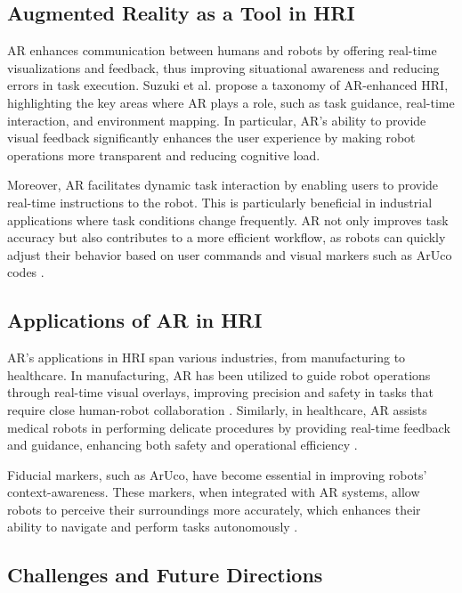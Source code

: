 \subsection{Augmented Reality as a Tool in HRI}

AR enhances communication between humans and robots by offering real-time visualizations and feedback, thus improving situational awareness and reducing errors in task execution. Suzuki et al. \cite{Suzuki2022} propose a taxonomy of AR-enhanced HRI, highlighting the key areas where AR plays a role, such as task guidance, real-time interaction, and environment mapping. In particular, AR’s ability to provide visual feedback significantly enhances the user experience by making robot operations more transparent and reducing cognitive load.

Moreover, AR facilitates dynamic task interaction by enabling users to provide real-time instructions to the robot. This is particularly beneficial in industrial applications where task conditions change frequently. AR not only improves task accuracy but also contributes to a more efficient workflow, as robots can quickly adjust their behavior based on user commands and visual markers such as ArUco codes \cite{Suzuki2022}.

\subsection{Applications of AR in HRI}

AR's applications in HRI span various industries, from manufacturing to healthcare. In manufacturing, AR has been utilized to guide robot operations through real-time visual overlays, improving precision and safety in tasks that require close human-robot collaboration \cite{Hentout2019}. Similarly, in healthcare, AR assists medical robots in performing delicate procedures by providing real-time feedback and guidance, enhancing both safety and operational efficiency \cite{Suzuki2022}. 

Fiducial markers, such as ArUco, have become essential in improving robots' context-awareness. These markers, when integrated with AR systems, allow robots to perceive their surroundings more accurately, which enhances their ability to navigate and perform tasks autonomously \cite{Hentout2019}.

\subsection{Challenges and Future Directions}

